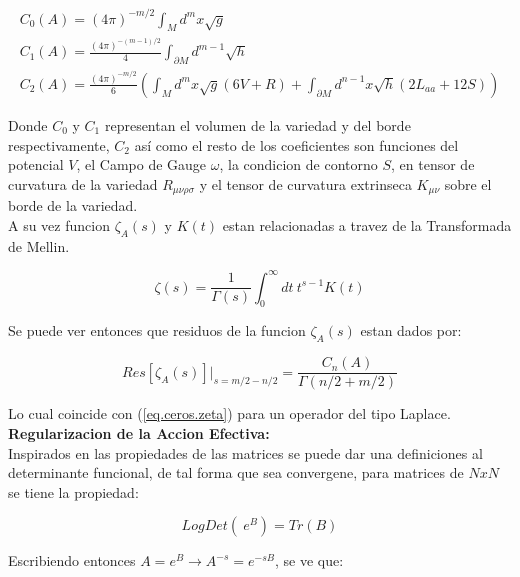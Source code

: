 \begin{equation}
\begin{array}{c}
C _0 (A) = (4 \pi ) ^{-m/2}  \int _M d ^m x \sqrt{g}  \\
C _1 (A) = \frac{(4 \pi) ^{-(m-1)/2} }{4} \int _{\partial M } d ^{m-1} \sqrt{h} \\
C _2 (A) = \frac{(4 \pi) ^{-m/2} }{6} \left(
									\int _M d ^m x\sqrt{g} (6 V + R) +
									\int _{\partial M } d ^{n-1} x 
									\sqrt{h} (2 L _{aa}  + 12 S)
									\right)
\end{array}
\end{equation} 

Donde $C _0$ y $C _1$ representan el volumen de la variedad y del borde respectivamente, $C _2$ así como el resto de los coeficientes son funciones del potencial $V$, el Campo de Gauge $\omega $, la condicion de contorno $S$, en tensor de curvatura de la variedad $R _{\mu \nu \rho \sigma }$ y el tensor de curvatura extrinseca $K _{\mu \nu }$ sobre el borde de la variedad. \\

A su vez funcion $\zeta _A (s) $ y $K(t)$ estan relacionadas a travez de la Transformada de Mellin.



\begin{equation}
\zeta (s) = \frac{1}{\Gamma (s) } 
\int _0 ^{\infty} dt \
t ^{s-1} K(t) 
\end{equation}

Se puede ver entonces que residuos de la funcion $\zeta _A (s)$ estan dados por:

\begin{equation}
Res[\zeta _A (s)] | _{s= m/2 - n/2} = \frac{C _n (A)}{\Gamma (n/2 + m/2)}
\end{equation}

Lo cual coincide con (\ref{eq.ceros.zeta}) para un operador del tipo Laplace. \\

\textbf{Regularizacion de la Accion Efectiva:} \\

Inspirados en las propiedades de las matrices se puede dar una definiciones al determinante funcional, de tal forma que sea convergene, para matrices de $ NxN$ se tiene la propiedad:

\begin{equation}
Log  Det \left( \ e ^B \right)  = Tr (B)
\end{equation}

Escribiendo entonces $A= e ^{B} \rightarrow A ^{-s} = e ^{-s B}$, se ve que:

